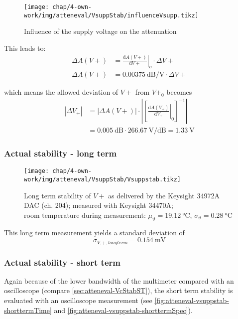 \begin{figure}[tb]
	\centering
	\texttt{[image: chap/4-own-work/img/atteneval/VsuppStab/influenceVsupp.tikz]}
	\caption{Influence of the supply voltage on the attenuation}
	\label{fig:atteneval-vsupp-influence}
\end{figure}

This leads to:
\begin{align}
\Delta A(V+) &= \left.\frac{\text{d}A(V+)}{\text{d}V+}\right|_{o} \cdot \Delta V+ \\
\Delta A(V+) &= \SI{0.00375}{\dB\per\volt} \cdot \Delta V+
\end{align}

which means the allowed deviation of $V+$ from $V+_0$ becomes
\begin{align}\label{eq:atteneval-stabVsupp}
\left|\Delta V_{+}\right| &= \left|\Delta A(V+)\right| \cdot 
\left|\left[\left.\frac{\text{d}A(V_{+})}{\text{d}V_{+}}\right|_{0}\right]^{-1}\right| \\
 &= \SI{0.005}{\dB} \cdot \SI{266.67}{\volt\per\dB} = \SI{1.33}{\volt}
\end{align}

\FloatBarrier
\newpage
\subsubsection{Actual stability - long term}

\begin{figure}[tb]
	\centering
	\texttt{[image: chap/4-own-work/img/atteneval/VsuppStab/Vsuppstab.tikz]}
	\caption{Long term stability of $V+$ as delivered by the Keysight 34972A DAC (ch. 204); measured with Keysight 34470A;\\room temperature during measurement: $\mu_\vartheta=\SI{19.12}{\degreeCelsius}$, $\sigma_\vartheta=\SI{0.28}{\degreeCelsius}$}
	\label{fig:atteneval-vsupplstab-longterm}
\end{figure}

This long term measurement yields a standard deviation of
\begin{equation}
\sigma_{V,+,longterm} = \SI{0.154}{\milli\volt}
\end{equation}

\FloatBarrier
\subsubsection{Actual stability - short term}
Again because of the lower bandwidth of the multimeter compared with an oscilloscope (compare \autoref{sec:atteneval-VcStabST}), the short term stability is evaluated with an oscilloscope measurement (see \autoref{fig:atteneval-vsuppstab-shorttermTime} and \autoref{fig:atteneval-vsuppstab-shorttermSpec}).

